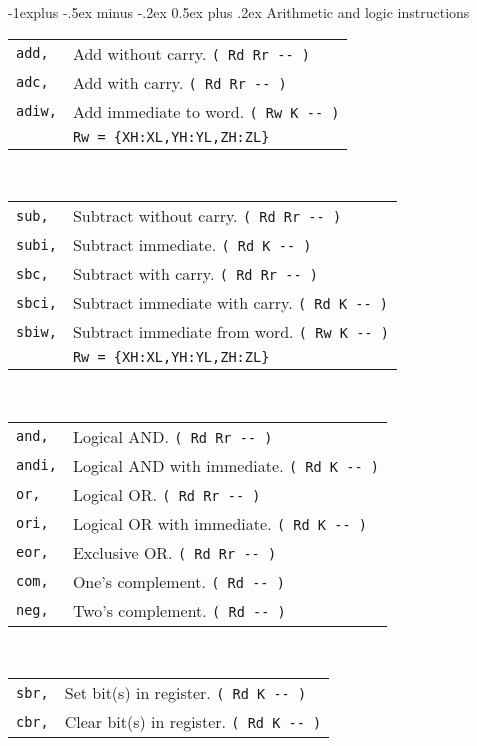 \documentclass[10pt,landscape,a4paper]{article}
\makeatletter
\renewcommand{\subsection}{\@startsection{subsection}{2}{0mm}%
                                {-1explus -.5ex minus -.2ex}%
                                {0.5ex plus .2ex}%
                                {\normalfont\normalsize\bfseries}}
\makeatother
\begin{document}
\begin{multicols}{3}
\medskip

\subsection{Arithmetic and logic instructions}
\begin{tabular}{@{}ll@{}}
\verb!add,! & Add without carry. \verb!( Rd Rr -- )! \\
\verb!adc,! & Add with carry. \verb!( Rd Rr -- )! \\
\verb!adiw,! & Add immediate to word. \verb!( Rw K -- )! \\
             & \verb!Rw = {XH:XL,YH:YL,ZH:ZL}! \\
\end{tabular}\\
\begin{tabular}{@{}ll@{}}
\verb!sub,! & Subtract without carry. \verb!( Rd Rr -- )! \\
\verb!subi,! & Subtract immediate. \verb!( Rd K -- )! \\
\verb!sbc,! & Subtract with carry. \verb!( Rd Rr -- )! \\
\verb!sbci,! & Subtract immediate with carry. \verb!( Rd K -- )! \\
\verb!sbiw,! & Subtract immediate from word. \verb!( Rw K -- )! \\
             & \verb!Rw = {XH:XL,YH:YL,ZH:ZL}! \\
\end{tabular}\\
\begin{tabular}{@{}ll@{}}
\verb!and,! & Logical AND. \verb!( Rd Rr -- )! \\
\verb!andi,! & Logical AND with immediate. \verb!( Rd K -- )! \\
\verb!or,! & Logical OR. \verb!( Rd Rr -- )! \\
\verb!ori,! & Logical OR with immediate. \verb!( Rd K -- )! \\
\verb!eor,! & Exclusive OR. \verb!( Rd Rr -- )! \\
\verb!com,! & One's complement. \verb!( Rd -- )! \\
\verb!neg,! & Two's complement. \verb!( Rd -- )! \\
\end{tabular}\\
\begin{tabular}{@{}ll@{}}
\verb!sbr,! & Set bit(s) in register. \verb!( Rd K -- )! \\
\verb!cbr,! & Clear bit(s) in register. \verb!( Rd K -- )! \\

\end{tabular}
\end{multicols}
\end{document}
